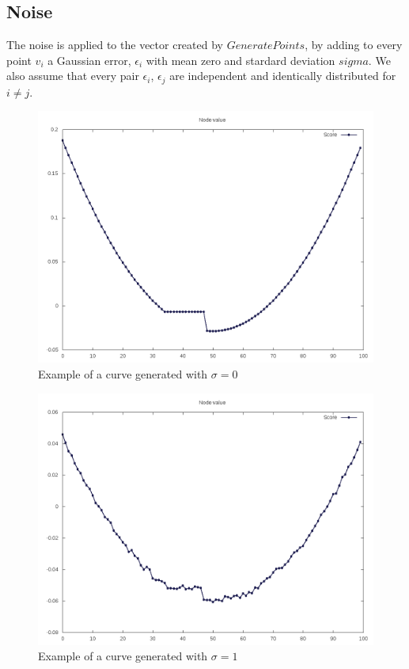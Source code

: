 \documentclass[12pt]{article}
\begin{document}
\subsection{Noise}
The noise is applied to the vector created by $GeneratePoints$, by adding to every point $v_i$ a Gaussian error, $\epsilon_i$ with mean zero and stardard deviation $sigma$. We also assume that every pair $\epsilon_i$, $\epsilon_j$  are independent and identically distributed for $i \neq j$.

\begin{figure}[H]
\caption{Example of a curve generated with $\sigma = 0$}
\centering
\includegraphics[scale=.5]{curve_sigma0}
\end{figure}

\begin{figure}[H]
\caption{Example of a curve generated with $\sigma = 1$}
\centering
\includegraphics[scale=.5]{curve_sigma1}
\end{figure}
\end{document}
